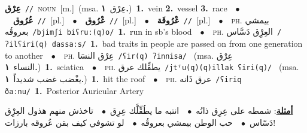 \documentclass[10pt,a4paper,twoside]{article} %
\begin{document}
\begin{multicols}{2}
{\setlength\topsep{0pt}\textbf{\foreignlanguage{arabic}{عِرْق}}\ {\color{gray}\texttt{//}\color{black}}\ \textsc{noun}\ [m.]\ \color{gray}(msa. \foreignlanguage{arabic}{عِرْق}~\foreignlanguage{arabic}{\textbf{١.}})\color{black}\ \textbf{1.}~vein  \textbf{2.}~vessel  \textbf{3.}~race\ \ $\bullet$\ \ \setlength\topsep{0pt}\textbf{\foreignlanguage{arabic}{عُرُوق}}\ {\color{gray}\texttt{//}\color{black}}\ [pl.]\ \ $\bullet$\ \ \setlength\topsep{0pt}\textbf{\foreignlanguage{arabic}{عْرُوق}}\ {\color{gray}\texttt{//}\color{black}}\ [pl.]\ \ $\bullet$\ \ \setlength\topsep{0pt}\textbf{\foreignlanguage{arabic}{عْرُوقَة}}\ {\color{gray}\texttt{//}\color{black}}\ [pl.]\ \ $\bullet$\ \ \textsc{ph.} \color{gray} \foreignlanguage{arabic}{بيمشي بعروقُه}\color{black}\ {\color{gray}\texttt{/{\sffamily bjimʃi biʕruː(q)o}/}\color{black}}\ \textbf{1.}~run in sb's blood\ \ $\bullet$\ \ \textsc{ph.} \color{gray} \foreignlanguage{arabic}{العِرِْق دَسَّاس}\color{black}\ {\color{gray}\texttt{/{\sffamily ʔilʕiri(q) dassaːs}/}\color{black}}\ \textbf{1.}~bad traits in people are passed on from one generation to another\ \ $\bullet$\ \ \textsc{ph.} \color{gray} \foreignlanguage{arabic}{عِرْق النسَا}\color{black}\ {\color{gray}\texttt{/{\sffamily ʕir(q) ʔinnisa}/}\color{black}}\ \color{gray} (msa. \foreignlanguage{arabic}{عِرْق النساء}~\foreignlanguage{arabic}{\textbf{١.}})\color{black}\ \textbf{1.}~sciatica\ \ $\bullet$\ \ \textsc{ph.} \color{gray} \foreignlanguage{arabic}{يطقِّلك عرق}\color{black}\ {\color{gray}\texttt{/{\sffamily jtˤu(q)(q)illak ʕiri(q)}/}\color{black}}\ \color{gray} (msa. \foreignlanguage{arabic}{يغْضب غضب شديداً}~\foreignlanguage{arabic}{\textbf{١.}})\color{black}\ \textbf{1.}~hit the roof\ \ $\bullet$\ \ \textsc{ph.} \color{gray} \foreignlanguage{arabic}{عرق ذَانه}\color{black}\ {\color{gray}\texttt{/{\sffamily ʕiriq ðaːnu}/}\color{black}}\ \textbf{1.}~Posterior Auricular Artery\  \begin{flushright}\color{gray}\foreignlanguage{arabic}{\textbf{\underline{\foreignlanguage{arabic}{أمثلة}}}: شمطه على عِرِق ذانُه\ $\bullet$\ \  انتبه ما يطُقِّلَّك عِرِق\ $\bullet$\ \  تاخذش منهم هذول العِرِْق دَسّاس\ $\bullet$\ \  حب الوطن بيمشي بعروقُه\ $\bullet$\ \  لو تشوفي كيف بقن عُروقه بارزات!}\end{flushright}\color{black}} \vspace{2mm}


\end{multicols}
\end{document}
